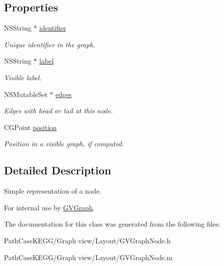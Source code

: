 \subsection*{Properties}
\begin{DoxyCompactItemize}
\item 
\hypertarget{interface_g_v_graph_node_a8b991fdddf28de3457b6c5a557a7a1b9}{
NSString $\ast$ \hyperlink{interface_g_v_graph_node_a8b991fdddf28de3457b6c5a557a7a1b9}{identifier}}
\label{interface_g_v_graph_node_a8b991fdddf28de3457b6c5a557a7a1b9}

\begin{DoxyCompactList}\small\item\em Unique identifier in the graph. \end{DoxyCompactList}\item 
\hypertarget{interface_g_v_graph_node_ae45c10d8bdf2c1a8c3de3973d22ac2b2}{
NSString $\ast$ \hyperlink{interface_g_v_graph_node_ae45c10d8bdf2c1a8c3de3973d22ac2b2}{label}}
\label{interface_g_v_graph_node_ae45c10d8bdf2c1a8c3de3973d22ac2b2}

\begin{DoxyCompactList}\small\item\em Visible label. \end{DoxyCompactList}\item 
\hypertarget{interface_g_v_graph_node_ae74e85ecac00d6fb500cf2ba17aea66a}{
NSMutableSet $\ast$ \hyperlink{interface_g_v_graph_node_ae74e85ecac00d6fb500cf2ba17aea66a}{edges}}
\label{interface_g_v_graph_node_ae74e85ecac00d6fb500cf2ba17aea66a}

\begin{DoxyCompactList}\small\item\em Edges with head or tail at this node. \end{DoxyCompactList}\item 
\hypertarget{interface_g_v_graph_node_a7d9a4b61c37b2b85fb0581753ca90e13}{
CGPoint \hyperlink{interface_g_v_graph_node_a7d9a4b61c37b2b85fb0581753ca90e13}{position}}
\label{interface_g_v_graph_node_a7d9a4b61c37b2b85fb0581753ca90e13}

\begin{DoxyCompactList}\small\item\em Position in a visible graph, if computed. \end{DoxyCompactList}\end{DoxyCompactItemize}


\subsection{Detailed Description}
Simple representation of a node. 

For internal use by \hyperlink{interface_g_v_graph}{GVGraph}. 

The documentation for this class was generated from the following files:\begin{DoxyCompactItemize}
\item 
PathCaseKEGG/Graph view/Layout/GVGraphNode.h\item 
PathCaseKEGG/Graph view/Layout/GVGraphNode.m\end{DoxyCompactItemize}
